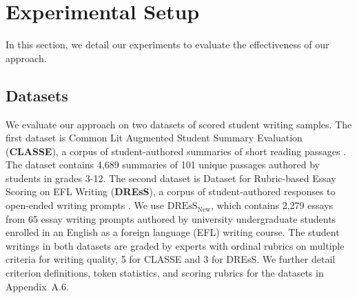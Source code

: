 \documentclass[letterpaper]{article} %
\begin{document}
\section{Experimental Setup}
In this section, we detail our experiments to evaluate the effectiveness of our approach.

\subsection{Datasets}
We evaluate our approach on two datasets of scored student writing samples. 
The first dataset is Common Lit Augmented Student Summary Evaluation (\textbf{CLASSE}), a corpus of student-authored summaries of short reading passages \cite{crossley-etal-2024-world}. The dataset contains 4,689 summaries of 101 unique passages authored by students in grades 3-12. 
%
The second dataset is Dataset for Rubric-based Essay Scoring on EFL Writing (\textbf{DREsS}), a corpus of student-authored responses to open-ended writing prompts \cite{yoo_dress_2025}. We use $\text{DREsS}_{\text{New}}$, which contains 2,279 essays from 65 essay writing prompts authored by university undergraduate students enrolled in an English as a foreign language (EFL) writing course. The student writings in both datasets are graded by experts with ordinal rubrics on multiple criteria for writing quality, 5 for CLASSE and 3 for DREsS. We further detail criterion definitions, token statistics, and scoring rubrics for the datasets in Appendix~A.6.


\end{document}
